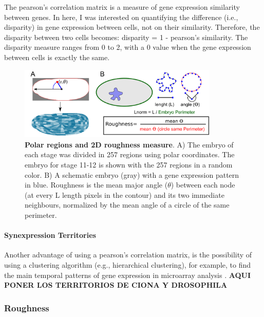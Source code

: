 The pearson's correlation matrix is a measure of gene expression similarity between genes. In here, I was interested on quantifying the difference (i.e., disparity) in gene expression between cells, not on their similarity. Therefore, the disparity between two cells becomes: disparity = 1 - pearson's similarity. The disparity measure ranges from 0 to 2, with a 0 value when the gene expression between cells is exactly the same.

\begin{figure}[h]
  \includegraphics[width=0.85\textwidth]{./Images/roughness_regions.png}
  \centering
  \caption{\textbf{Polar regions and 2D roughness measure}. A) The embryo of each stage was divided in 257 regions using polar coordinates. The embryo for stage 11-12 is shown with the 257 regions in a random color. B) A schematic embryo (gray) with a gene expression pattern in blue. Roughness is the mean major angle ($\theta$) between each node (at every L length pixels in the contour) and its two immediate neighbours, normalized by the mean angle of a circle of the same perimeter.
   }
  \label{fig:roughness_regions}
\end{figure}

\paragraph{Synexpression Territories} 
Another advantage of using a pearson's correlation matrix, is the possibility of using a clustering algorithm (e.g., hierarchical clustering), for example, to find the main temporal patterns of gene expression in microarray analysis \citep{Eisen1998,Wen1998}. 
\textbf{AQUI PONER LOS TERRITORIOS DE CIONA Y DROSOPHILA}


\subsubsection{Roughness}

